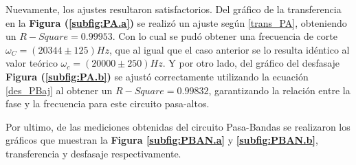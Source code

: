 \documentclass[11pt,a4paper]{article}
\begin{document}
Nuevamente, los ajustes resultaron satisfactorios. Del gráfico de la transferencia en la \textbf{Figura (\ref{subfig:PA.a})} se realizó un ajuste según \eqref{trans_PA}, obteniendo un $R-Square = 0.99953$. Con lo cual se pudó obtener una frecuencia de corte $\omega_C = (20344 \pm 125)Hz$, que al igual que el caso anterior se lo resulta idéntico al valor teórico $\omega_c = (20000 \pm 250)Hz$. Y por otro lado, del gráfico del desfasaje \textbf{Figura (\ref{subfig:PA.b})} se ajustó correctamente utilizando la ecuación \eqref{des_PBaj} al obtener un $R-Square = 0.99832$, garantizando la relación entre la fase y la frecuencia para este circuito pasa-altos.

\bigskip

Por ultimo, de las mediciones obtenidas del circuito Pasa-Bandas se realizaron los gráficos que muestran la \textbf{Figura \ref{subfig:PBAN.a}} y \textbf{\ref{subfig:PBAN.b}}, transferencia y desfasaje respectivamente.
\end{document}
